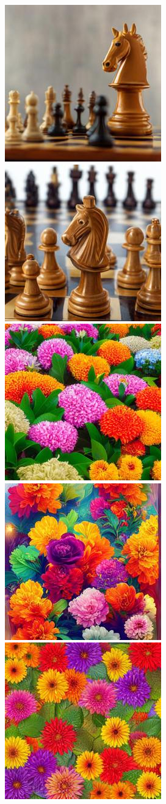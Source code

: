 \begin{figure}[h!]
\begin{subfigure}[t]{0.32\linewidth}
	\includegraphics[width=0.320\linewidth]{figs/samples_appendix_3/adjmat_cfg_2_ode_prompt_75_image_2.jpg}\;%
	\includegraphics[width=0.320\linewidth]{figs/samples_appendix_3/adjmat_cfg_2_ode_prompt_75_image_3.jpg}\\ 
	\includegraphics[width=0.320\linewidth]{figs/samples_appendix_3/adjmat_cfg_2_ode_prompt_90_image_1.jpg}\;%
	\includegraphics[width=0.320\linewidth]{figs/samples_appendix_3/adjmat_cfg_2_ode_prompt_90_image_2.jpg}\;%
	\includegraphics[width=0.320\linewidth]{figs/samples_appendix_3/adjmat_cfg_2_ode_prompt_90_image_3.jpg}

\end{subfigure}
\end{figure}
